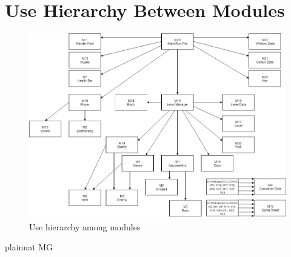 \documentclass[12pt, titlepage]{article}
\begin{document}
\section{Use Hierarchy Between Modules} \label{SecUse}

\begin{figure}[H]
\centering
\includegraphics[width=1\textwidth]{MGOG.png}
\caption{Use hierarchy among modules}
\label{FigUH}
\end{figure}


 {plainnat}
 {MG}
\end{document}
